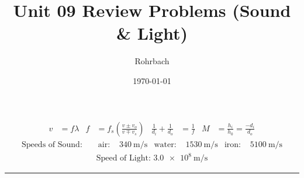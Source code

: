 \documentclass[10pt]{exam}
\title{Unit 09 Review Problems (Sound \& Light)}
\author{Rohrbach}
\date{\today}
\begin{document}
\maketitle

\newcommand{\printeq}{

  \begin{align*}
      v   &=  f\lambda
    & f   &= f_s \left( \frac{v\pm v_o}{v\mp v_s} \right)
    & \frac{1}{d_i} + \frac{1}{d_o} &= \frac{1}{f}
    & M &= \frac{h_i}{h_0} = \frac{-d_i}{d_o}
  \end{align*}
  \vspace{-1em}
  \begin{align*}
    \text{Speeds of Sound: } & 
    & \text{air: }   & \SI{340}{\meter\per\second}
    & \text{water: } & \SI{1530}{\meter\per\second}
    & \text{iron: }  & \SI{5100}{\meter\per\second}
  \end{align*}
  \vspace{-2em}
  \begin{align*}
    \text{Speed of Light: }
    \SI{3.0e8}{\meter\per\second}
  \end{align*}
  
  \hrule
}

\printeq
\end{document}

